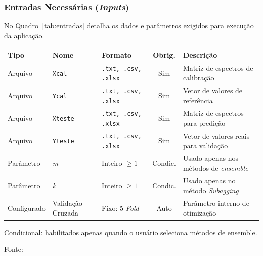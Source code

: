 \newpage
\subsubsection{Entradas Necessárias (\textit{Inputs})}
\label{ssubsec:entradas}

No Quadro~\ref{tab:entradas} detalha os dados e parâmetros exigidos para execução da aplicação.

\begin{quadro}[ht]
\begin{center}
\small
\captionsetup{justification=centering, labelsep=endash, width=0.75\linewidth}
\caption{Entradas necessárias para execução do sistema.}
\label{tab:entradas}
\begin{threeparttable}
\begin{tabularx}{\textwidth}{|l|l|l|c|X|} \hline
\textbf{Tipo} & \textbf{Nome} & \textbf{Formato} & \textbf{Obrig.} & \textbf{Descrição} \\ \hline
Arquivo & \texttt{Xcal} & \texttt{.txt, .csv, .xlsx} & Sim & Matriz de espectros de calibração \\ \hline
Arquivo & \texttt{Ycal} & \texttt{.txt, .csv, .xlsx} & Sim & Vetor de valores de referência \\ \hline
Arquivo & \texttt{Xteste} & \texttt{.txt, .csv, .xlsx} & Sim & Matriz de espectros para predição \\ \hline
Arquivo & \texttt{Yteste} & \texttt{.txt, .csv, .xlsx} & Sim & Vetor de valores reais para validação \\ \hline
Parâmetro & \textit{m} & Inteiro $\geq 1$ & Condic.\tnote{a} & Usado apenas nos métodos de \textit{ensemble} \\ \hline
Parâmetro & \textit{k} & Inteiro $\geq 1$ & Condic.\tnote{a} & Usado apenas no método \textit{Subagging} \\ \hline
Configurado & Validação Cruzada & Fixo: 5-\textit{Fold} & Auto & Parâmetro interno de otimização \\ \hline
\end{tabularx}
\begin{tablenotes}[flushleft]
\footnotesize
\item[a] Condicional: habilitados apenas quando o usuário seleciona métodos de ensemble.
\item Fonte:~\oautor
\end{tablenotes}
\end{threeparttable}
\end{center}
\end{quadro}


